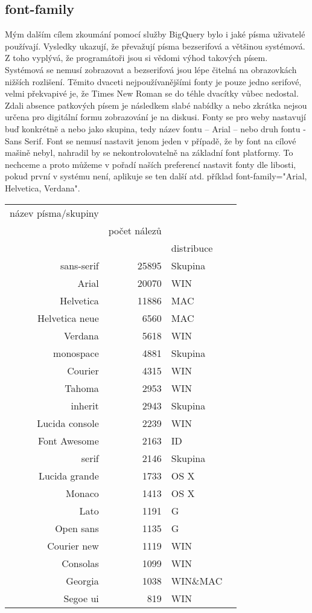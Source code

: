 \documentclass{article}
\begin{document}
\subsection{font-family}
Mým dalším cílem zkoumání pomocí služby BigQuery bylo i jaké písma uživatelé používají. Vysledky ukazují, že převažují písma bezserifová a většinou systémová. Z toho vyplývá, že programátoři jsou si vědomi výhod takových písem. Systémová se nemusí zobrazovat a bezserifová jsou lépe čitelná na obrazovkách nižších rozlišení. Těmito dvaceti nejpoužívanějšími fonty je pouze jedno serifové, velmi překvapivé je, že Times New Roman se do téhle dvacítky vůbec nedostal. Zdali absence patkových písem je následkem slabé nabídky a nebo zkrátka nejsou určena pro digitální formu zobrazování je na diskusi. Fonty se pro weby nastavují buď konkrétně a nebo jako skupina, tedy název fontu – Arial – nebo druh fontu - Sans Serif. Font se nemusí nastavit jenom jeden v případě, že by font na cílové mašině nebyl, nahradil by se nekontrolovatelně na základní font platformy. To nechceme a proto můžeme v pořadí naších preferencí nastavit fonty dle libosti, pokud první v systému není, aplikuje se ten další atd. příklad font-family="Arial, Helvetica, Verdana".

\begin{tabular}{r|rlr}
název písma/skupiny & \\
& počet nálezů & \\
&& distribuce&\\
\midrule
sans-serif & 25895 &  Skupina\\
Arial & 20070 & WIN\\
Helvetica & 11886 & MAC\\
Helvetica neue & 6560 & MAC\\
Verdana & 5618 & WIN\\
monospace & 4881 & Skupina\\
Courier & 4315 & WIN\\
Tahoma & 2953 & WIN\\
inherit & 2943 & Skupina\\
Lucida console & 2239 & WIN\\
Font Awesome & 2163 & ID\\
serif & 2146 & Skupina\\
Lucida grande & 1733 & OS X\\
Monaco & 1413 & OS X\\
Lato & 1191 & G\\
Open sans & 1135 & G\\
Courier new & 1119 & WIN\\
Consolas & 1099 & WIN\\
Georgia &  1038 & WIN\&MAC\\
Segoe ui & 819 & WIN\\
\end{tabular}
\end{document}

